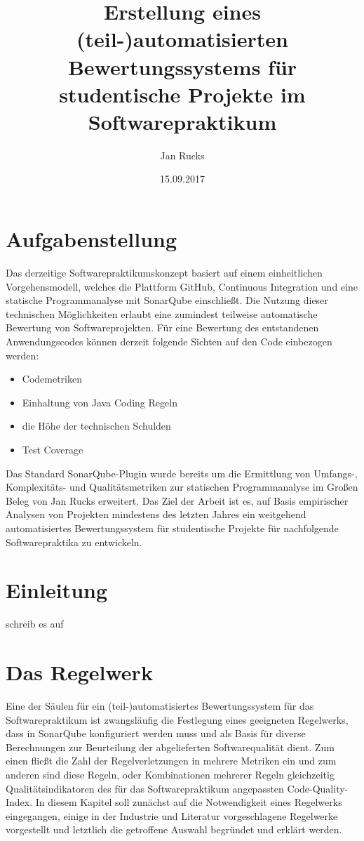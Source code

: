 \documentclass[da,ngerman]{stthesis}
\title{Erstellung eines (teil-)automatisierten \newline
Bewertungssystems für studentische \newline
Projekte im Softwarepraktikum}
\author{Jan Rucks}
\date{15.09.2017}
\begin{document}
	\maketitle 
	\chapter*{Aufgabenstellung}
		Das derzeitige Softwarepraktikumskonzept basiert auf einem einheitlichen Vorgehensmodell, welches die Plattform GitHub, Continuous Integration und eine statische Programmanalyse mit SonarQube einschließt. \newline \newline
		Die Nutzung dieser technischen Möglichkeiten erlaubt eine zumindest teilweise automatische Bewertung von Softwareprojekten. \newline \newline
		Für eine Bewertung des entstandenen Anwendungscodes können derzeit folgende Sichten auf den Code einbezogen werden:
		\begin{itemize}
			\item Codemetriken
			\item Einhaltung von Java Coding Regeln
			\item die Höhe der technischen Schulden
			\item Test Coverage
		\end{itemize} 
		Das Standard SonarQube-Plugin wurde bereits um die Ermittlung von Umfangs-, Komplexitäts- und Qualitätsmetriken zur statischen Programmanalyse im Großen Beleg von Jan Rucks erweitert. \newline \newline
		Das Ziel der Arbeit ist es, auf Basis empirischer Analysen von Projekten mindestens des letzten Jahres ein weitgehend automatisiertes Bewertungssystem für studentische Projekte für nachfolgende Softwarepraktika zu entwickeln.
		
	\tableofcontents
  
	\chapter{Einleitung}
  		schreib es auf
    
	\chapter{Das Regelwerk}
		Eine der Säulen für ein (teil-)automatisiertes Bewertungssystem für das Softwarepraktikum ist zwangsläufig die Festlegung eines geeigneten Regelwerks, dass in SonarQube konfiguriert werden muss und als Basis für diverse Berechnungen zur Beurteilung der abgelieferten Softwarequalität dient. Zum einen fließt die Zahl der Regelverletzungen in mehrere Metriken ein und zum anderen sind diese Regeln, oder Kombinationen mehrerer Regeln gleichzeitig Qualitätsindikatoren des für das Softwarepraktikum angepassten Code-Quality-Index. In diesem Kapitel soll zunächst auf die Notwendigkeit eines Regelwerks eingegangen, einige in der Industrie und Literatur vorgeschlagene Regelwerke vorgestellt und letztlich die getroffene Auswahl begründet und erklärt werden.
\end{document}
